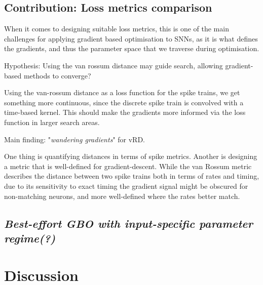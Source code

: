 \documentclass[mphil,deptreport,ai]{infthesis} %
\begin{document}


\subsection{Contribution: Loss metrics comparison}

When it comes to designing suitable loss metrics, this is one of the main challenges for applying gradient based optimisation to SNNs, as it is what defines the gradients, and thus the parameter space that we traverse during optimisation.



Hypothesis: Using the van rossum distance may guide search, allowing gradient-based methods to converge?

Using the van-rossum distance as a loss function for the spike trains, we get something more continuous, since the discrete spike train is convolved with a time-based kernel. 
This should make the gradients more informed via the loss function in larger search areas.


Main finding: 
"\textit{wandering gradients}" for vRD.

One thing is quantifying distances in terms of spike metrics.
Another is designing a metric that is well-defined for gradient-descent.
While the van Rossum metric describes the distance between two spike trains both in terms of rates and timing, due to its sensitivity to exact timing the gradient signal might be obscured for non-matching neurons, and more well-defined where the rates better match.


\subsection{\textit{Best-effort GBO with input-specific parameter regime(?)}}


\section{Discussion}
\end{document}
